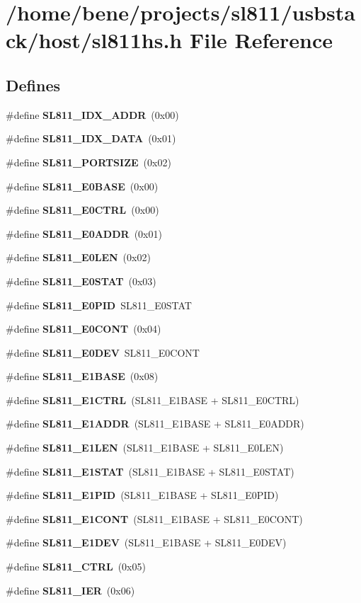 \section{/home/bene/projects/sl811/usbstack/host/sl811hs.h File Reference}
\label{sl811hs_8h}
\subsection*{Defines}
\begin{CompactItemize}
\item 
\#define {\bf SL811\_\-IDX\_\-ADDR}~(0x00)
\item 
\#define {\bf SL811\_\-IDX\_\-DATA}~(0x01)
\item 
\#define {\bf SL811\_\-PORTSIZE}~(0x02)
\item 
\#define {\bf SL811\_\-E0BASE}~(0x00)
\item 
\#define {\bf SL811\_\-E0CTRL}~(0x00)
\item 
\#define {\bf SL811\_\-E0ADDR}~(0x01)
\item 
\#define {\bf SL811\_\-E0LEN}~(0x02)
\item 
\#define {\bf SL811\_\-E0STAT}~(0x03)
\item 
\#define {\bf SL811\_\-E0PID}~SL811\_\-E0STAT
\item 
\#define {\bf SL811\_\-E0CONT}~(0x04)
\item 
\#define {\bf SL811\_\-E0DEV}~SL811\_\-E0CONT
\item 
\#define {\bf SL811\_\-E1BASE}~(0x08)
\item 
\#define {\bf SL811\_\-E1CTRL}~(SL811\_\-E1BASE + SL811\_\-E0CTRL)
\item 
\#define {\bf SL811\_\-E1ADDR}~(SL811\_\-E1BASE + SL811\_\-E0ADDR)
\item 
\#define {\bf SL811\_\-E1LEN}~(SL811\_\-E1BASE + SL811\_\-E0LEN)
\item 
\#define {\bf SL811\_\-E1STAT}~(SL811\_\-E1BASE + SL811\_\-E0STAT)
\item 
\#define {\bf SL811\_\-E1PID}~(SL811\_\-E1BASE + SL811\_\-E0PID)
\item 
\#define {\bf SL811\_\-E1CONT}~(SL811\_\-E1BASE + SL811\_\-E0CONT)
\item 
\#define {\bf SL811\_\-E1DEV}~(SL811\_\-E1BASE + SL811\_\-E0DEV)
\item 
\#define {\bf SL811\_\-CTRL}~(0x05)
\item 
\#define {\bf SL811\_\-IER}~(0x06)

\end{CompactItemize}

